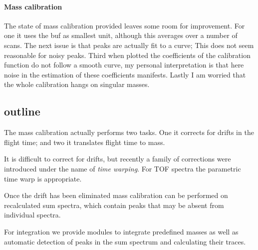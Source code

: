 \paragraph{Mass calibration}

The state of mass calibration provided leaves some room for improvement.
For one it uses the buf as smallest unit, although this averages over a
number of scans.  The next issue is that peaks are actually fit to a
curve; This does not seem reasonable for noisy peaks.  Third when
plotted the coefficients of the calibration function do not follow a
smooth curve, my personal interpretation is that here noise in the
estimation of these coefficients manifests.  Lastly I am worried that
the whole calibration hangs on singular masses.  

\subsection{outline}

The mass calibration actually performs two tasks.  One it corrects for
drifts in the flight time; and two it translates flight time to mass.

It is difficult to correct for drifts, but recently a family of
corrections were introduced under the name of \emph{time warping}.  For
\ac{TOF} spectra the parametric time warp \citep{Eilers2004a} is appropriate.

Once the drift has been eliminated mass calibration can be performed on
recalculated sum spectra, which contain peaks that may be absent from
individual spectra.

For integration we provide modules to integrate predefined masses as
well as automatic detection of peaks in the sum spectrum and calculating
their traces. 
